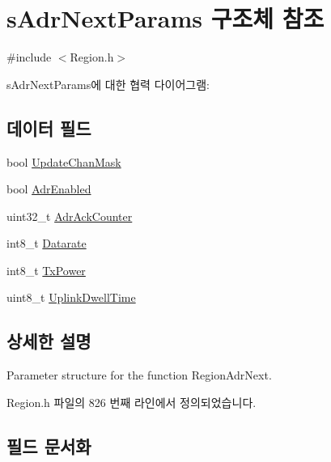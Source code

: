 \hypertarget{structs_adr_next_params}{}\section{s\+Adr\+Next\+Params 구조체 참조}
\label{structs_adr_next_params}


{\ttfamily \#include $<$Region.\+h$>$}



s\+Adr\+Next\+Params에 대한 협력 다이어그램\+:
\subsection*{데이터 필드}
\begin{DoxyCompactItemize}
\item 
bool \mbox{\hyperlink{structs_adr_next_params_a708080da9c63d868556b2c48cb53003b}{Update\+Chan\+Mask}}
\item 
bool \mbox{\hyperlink{structs_adr_next_params_ab3e2fb44577c95786e11aacd56769703}{Adr\+Enabled}}
\item 
uint32\+\_\+t \mbox{\hyperlink{structs_adr_next_params_a24f0356a3491bf07be9ac99ffa33896a}{Adr\+Ack\+Counter}}
\item 
int8\+\_\+t \mbox{\hyperlink{structs_adr_next_params_ae2f6080f3aa0e9485c55513ca56bb24d}{Datarate}}
\item 
int8\+\_\+t \mbox{\hyperlink{structs_adr_next_params_a037b4f849fa8ed4aa1d3c58aef2b28ec}{Tx\+Power}}
\item 
uint8\+\_\+t \mbox{\hyperlink{structs_adr_next_params_a0e6663762d6f9173bc8d8cb018f8f17a}{Uplink\+Dwell\+Time}}
\end{DoxyCompactItemize}


\subsection{상세한 설명}
Parameter structure for the function Region\+Adr\+Next. 

Region.\+h 파일의 826 번째 라인에서 정의되었습니다.



\subsection{필드 문서화}
\mbox{\label{structs_adr_next_params_a24f0356a3491bf07be9ac99ffa33896a}} 
